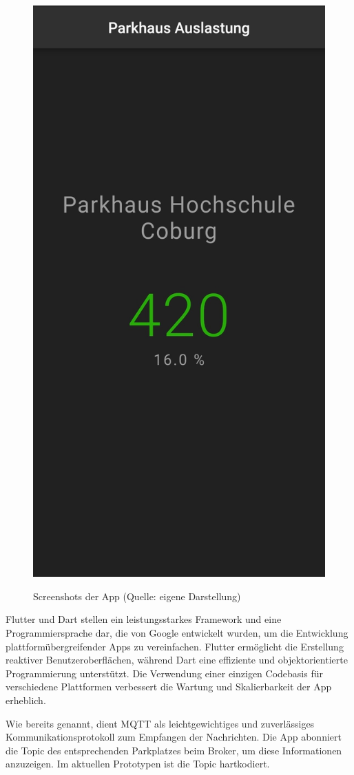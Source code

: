 \begin{figure}[h]
{		\includegraphics[width=0.3\myImageWidth]{Bilder/app_420.jpg}}
	\caption[Screenshots der App]{Screenshots der App (Quelle: eigene Darstellung)}\label{fig:app}
\end{figure}

Flutter und Dart stellen ein leistungsstarkes Framework und eine Programmiersprache dar, die von Google entwickelt wurden, um die Entwicklung plattformübergreifender Apps zu vereinfachen.
Flutter ermöglicht die Erstellung reaktiver Benutzeroberflächen, während Dart eine effiziente und objektorientierte Programmierung unterstützt.
Die Verwendung einer einzigen Codebasis für verschiedene Plattformen verbessert die Wartung und Skalierbarkeit der App erheblich.~\cite{awsWasIstFlutter}~\cite{dartDartOverview}

Wie bereits genannt, dient MQTT als leichtgewichtiges und zuverlässiges Kommunikationsprotokoll zum Empfangen der Nachrichten.
Die App abonniert die Topic des entsprechenden Parkplatzes beim Broker, um diese Informationen anzuzeigen.
Im aktuellen Prototypen ist die Topic hartkodiert.
